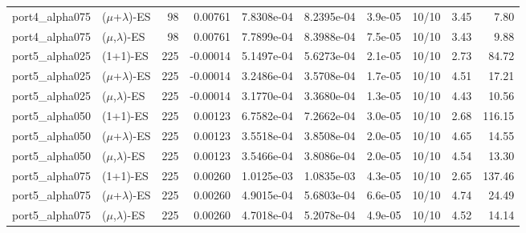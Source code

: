 \begin{tabular}{llrrrrrrrr}
port4\_alpha075 & ($\mu$+$\lambda$)-ES & 98 & 0.00761 & 7.8308e-04 & 8.2395e-04 & 3.9e-05 & 10/10 & 3.45 & 7.80 \\
port4\_alpha075 & ($\mu$,$\lambda$)-ES & 98 & 0.00761 & 7.7899e-04 & 8.3988e-04 & 7.5e-05 & 10/10 & 3.43 & 9.88 \\
port5\_alpha025 & (1+1)-ES & 225 & -0.00014 & 5.1497e-04 & 5.6273e-04 & 2.1e-05 & 10/10 & 2.73 & 84.72 \\
port5\_alpha025 & ($\mu$+$\lambda$)-ES & 225 & -0.00014 & 3.2486e-04 & 3.5708e-04 & 1.7e-05 & 10/10 & 4.51 & 17.21 \\
port5\_alpha025 & ($\mu$,$\lambda$)-ES & 225 & -0.00014 & 3.1770e-04 & 3.3680e-04 & 1.3e-05 & 10/10 & 4.43 & 10.56 \\
port5\_alpha050 & (1+1)-ES & 225 & 0.00123 & 6.7582e-04 & 7.2662e-04 & 3.0e-05 & 10/10 & 2.68 & 116.15 \\
port5\_alpha050 & ($\mu$+$\lambda$)-ES & 225 & 0.00123 & 3.5518e-04 & 3.8508e-04 & 2.0e-05 & 10/10 & 4.65 & 14.55 \\
port5\_alpha050 & ($\mu$,$\lambda$)-ES & 225 & 0.00123 & 3.5466e-04 & 3.8086e-04 & 2.0e-05 & 10/10 & 4.54 & 13.30 \\
port5\_alpha075 & (1+1)-ES & 225 & 0.00260 & 1.0125e-03 & 1.0835e-03 & 4.3e-05 & 10/10 & 2.65 & 137.46 \\
port5\_alpha075 & ($\mu$+$\lambda$)-ES & 225 & 0.00260 & 4.9015e-04 & 5.6803e-04 & 6.6e-05 & 10/10 & 4.74 & 24.49 \\
port5\_alpha075 & ($\mu$,$\lambda$)-ES & 225 & 0.00260 & 4.7018e-04 & 5.2078e-04 & 4.9e-05 & 10/10 & 4.52 & 14.14 \\
\hline
\end{tabular}
